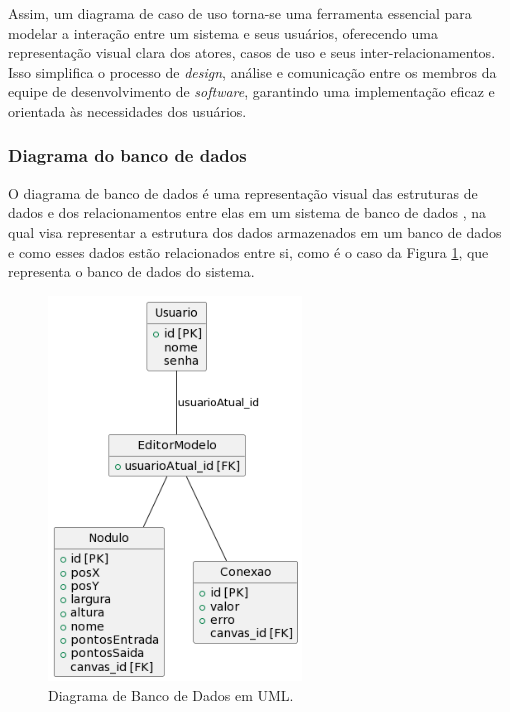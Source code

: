 Assim, um diagrama de caso de uso torna-se uma ferramenta essencial para modelar a interação entre um sistema e seus usuários, oferecendo uma representação visual clara dos atores, casos de uso e seus inter-relacionamentos. Isso simplifica o processo de \textit{design}, análise e comunicação entre os membros da equipe de desenvolvimento de \textit{software}, garantindo uma implementação eficaz e orientada às necessidades dos usuários.

\subsubsection{Diagrama do banco de dados}

O diagrama de banco de dados é uma representação visual das estruturas de dados e dos relacionamentos entre elas em um sistema de banco de dados \cite{databasedepth}, na qual visa representar a estrutura dos dados armazenados em um banco de dados e como esses dados estão relacionados entre si, como é o caso da Figura \ref{fig:DatabaseDiagram}, que representa o banco de dados do sistema.
            
\begin{figure}[htb]
    \caption{\label{fig:DatabaseDiagram}Diagrama de Banco de Dados em UML.}
    \begin{center}
        \includegraphics[width=0.6\textwidth]{figuras/DatabaseDiagram.png}
    \end{center}
\end{figure}
            
